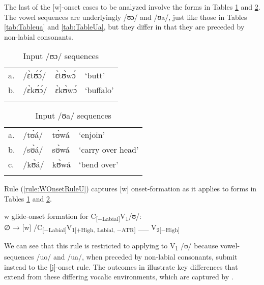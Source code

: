 \documentclass[output=paper,colorlinks,citecolor=brown]{langscibook}
\begin{document}
The last of the [w]-onset cases to be analyzed involve the forms in 
Tables \ref{tab:TableueUO} and \ref{tab:TableueUa}. The vowel sequences are underlyingly /ʊɔ/ and /ʊa/, just like those in Tables \ref{tab:Tableua} and \ref{tab:TableUa}, but they differ in that they are preceded by non-labial consonants. 

 \begin{table}
\caption{Input /ʊɔ/ sequences}
\label{tab:TableueUO}
 \begin{tabular}{llll}
  \lsptoprule
a. &	/ɛ̀tʊ́ɔ́/ &	ɛ̀tʊ̀wɔ́	&‘butt’\\
b. & 	/ɛ̀kʊ́ɔ́/ & 	ɛ̀kʊ̀wɔ́	&  ‘buffalo’ \\
  \lspbottomrule
 \end{tabular}
 \end{table}

  \begin{table}
\caption{Input /ʊa/ sequences}
\label{tab:TableueUa}
 \begin{tabular}{llll}
  \lsptoprule
a. & 	/tʊ̀á/	&  tʊ̀wá	&  ‘enjoin’\\
b. & 	/sʊ̀á/ & 	sʊ̀wá	& ‘carry over head’\\
c. &  	/kʊ̀á/ & 	kʊ̀wá	& ‘bend over’\\
  \lspbottomrule
 \end{tabular}
 \end{table}

\noindent Rule (\ref{rule:WOnsetRuleU}) captures [w] onset-formation as it applies to forms in Tables \ref{tab:TableueUO} and \ref{tab:TableueUa}.

\ea \label{rule:WOnsetRuleU}
\begin{xlist}
w glide-onset formation for C\textsubscript{[−Labial]}V\textsubscript{1}/ʊ/:	\\
	∅ → [w] /C\textsubscript{[−Labial]}V\textsubscript{1[+High, Labial, −ATR]} \_\_ V\textsubscript{2[−High]} \\
\end{xlist}
\z

We can see that this rule is restricted to applying to V\textsubscript{1} /ʊ/ because vowel-sequences /uo/ and /ua/, when preceded by non-labial consonants, submit instead to the [j]-onset rule. The outcomes in  illustrate key differences that extend from these differing vocalic environments, which are captured by .  
\end{document}
